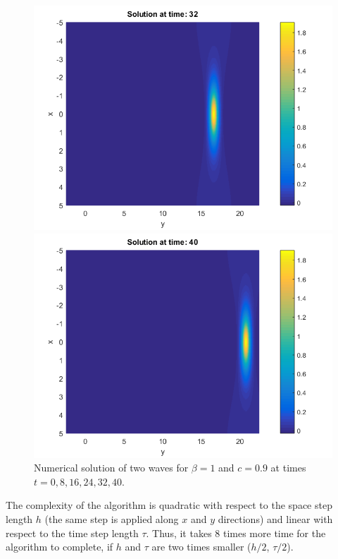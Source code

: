 \documentclass[11pt,a4paper,twoside]{article}
\begin{document}
\begin{figure}[!htbp]
\begin{minipage}[b]{0.31\linewidth}
		 \includegraphics[width=\linewidth]{Pictures/Solution_bt3_t=32.png}
	\end{minipage}
	\begin{minipage}[b]{0.31\linewidth}
		 \includegraphics[width=\linewidth]{Pictures/Solution_bt3_t=40.png}
	\end{minipage}
	\caption{Numerical solution of two waves for $\beta=1$ and $c = 0.9$ at times $t=0,8,16,24,32,40$.}
	\label{fig:oneWaveB}
\end{figure}
The complexity of the algorithm is quadratic with respect to the space step length $h$ (the same step is applied along $x$ and $y$ directions) and linear with respect to the time step length $\tau$. Thus, it takes 8 times more time for the algorithm to complete, if $h$ and $\tau$ are two times smaller ($h/2$, $\tau/2$).
\end{document}
